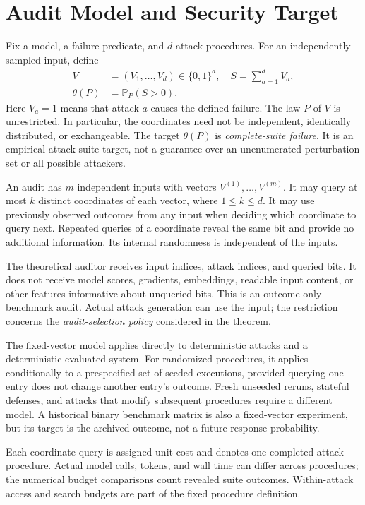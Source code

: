 \documentclass[conference]{IEEEtran}
\newcommand{\Prob}{\mathbb{P}}
\begin{document}
\section{Audit Model and Security Target}\label{sec:model}
Fix a model, a failure predicate, and $d$ attack procedures. For an independently sampled input, define
\begin{equation}
 \begin{aligned}
 V&=(V_1,\ldots,V_d)\in\{0,1\}^d,\quad S=\sum_{a=1}^d V_a,\\
 \theta(P)&=\Prob_P(S>0).
 \end{aligned}
\end{equation}
Here $V_a=1$ means that attack $a$ causes the defined failure. The law $P$ of $V$ is unrestricted. In particular, the coordinates need not be independent, identically distributed, or exchangeable. The target $\theta(P)$ is \emph{complete-suite failure}. It is an empirical attack-suite target, not a guarantee over an unenumerated perturbation set or all possible attackers.

An audit has $m$ independent inputs with vectors $V^{(1)},\ldots,V^{(m)}$. It may query at most $k$ distinct coordinates of each vector, where $1\leq k\leq d$. It may use previously observed outcomes from any input when deciding which coordinate to query next. Repeated queries of a coordinate reveal the same bit and provide no additional information. Its internal randomness is independent of the inputs.

The theoretical auditor receives input indices, attack indices, and queried bits. It does not receive model scores, gradients, embeddings, readable input content, or other features informative about unqueried bits. This is an outcome-only benchmark audit. Actual attack generation can use the input; the restriction concerns the \emph{audit-selection policy} considered in the theorem. 

The fixed-vector model applies directly to deterministic attacks and a deterministic evaluated system. For randomized procedures, it applies conditionally to a prespecified set of seeded executions, provided querying one entry does not change another entry's outcome. Fresh unseeded reruns, stateful defenses, and attacks that modify subsequent procedures require a different model. A historical binary benchmark matrix is also a fixed-vector experiment, but its target is the archived outcome, not a future-response probability.

Each coordinate query is assigned unit cost and denotes one completed attack procedure. Actual model calls, tokens, and wall time can differ across procedures; the numerical budget comparisons count revealed suite outcomes. Within-attack access and search budgets are part of the fixed procedure definition.
\end{document}
